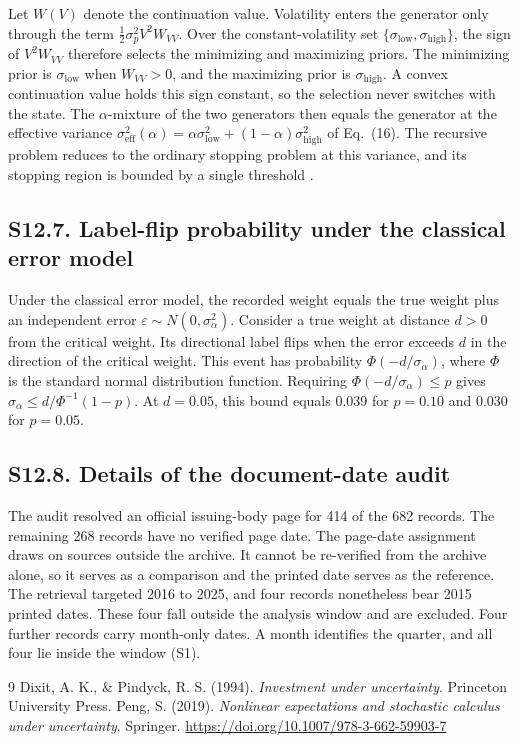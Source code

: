 \documentclass[11pt]{article}
\newcommand{\slow}{\sigma_{\mathrm{low}}}
\newcommand{\shigh}{\sigma_{\mathrm{high}}}
\begin{document}
Let $W(V)$ denote the continuation value. Volatility enters the generator only through the term $\tfrac{1}{2}\sigma_p^{2}V^{2}W_{VV}$. Over the constant-volatility set $\{\slow,\shigh\}$, the sign of $V^{2}W_{VV}$ therefore selects the minimizing and maximizing priors. The minimizing prior is $\slow$ when $W_{VV}>0$, and the maximizing prior is $\shigh$. A convex continuation value holds this sign constant, so the selection never switches with the state. The $\alpha$-mixture of the two generators then equals the generator at the effective variance $\sigma_{\mathrm{eff}}^{2}(\alpha)=\alpha\slow^{2}+(1-\alpha)\shigh^{2}$ of Eq.~(16). The recursive problem reduces to the ordinary stopping problem at this variance, and its stopping region is bounded by a single threshold \citep{Peng2019}.

\subsection*{S12.7. Label-flip probability under the classical error model}

Under the classical error model, the recorded weight equals the true weight plus an independent error $\varepsilon\sim N(0,\sigma_{\alpha}^{2})$. Consider a true weight at distance $d>0$ from the critical weight. Its directional label flips when the error exceeds $d$ in the direction of the critical weight. This event has probability $\Phi(-d/\sigma_{\alpha})$, where $\Phi$ is the standard normal distribution function. Requiring $\Phi(-d/\sigma_{\alpha})\le p$ gives $\sigma_{\alpha}\le d/\Phi^{-1}(1-p)$. At $d=0.05$, this bound equals 0.039 for $p=0.10$ and 0.030 for $p=0.05$.

\subsection*{S12.8. Details of the document-date audit}

The audit resolved an official issuing-body page for 414 of the 682 records. The remaining 268 records have no verified page date. The page-date assignment draws on sources outside the archive. It cannot be re-verified from the archive alone, so it serves as a comparison and the printed date serves as the reference. The retrieval targeted 2016 to 2025, and four records nonetheless bear 2015 printed dates. These four fall outside the analysis window and are excluded. Four further records carry month-only dates. A month identifies the quarter, and all four lie inside the window (S1).

\begin{thebibliography}{9}
Dixit, A. K., \& Pindyck, R. S. (1994). \emph{Investment under uncertainty}. Princeton University Press.
Peng, S. (2019). \emph{Nonlinear expectations and stochastic calculus under uncertainty}. Springer. \url{https://doi.org/10.1007/978-3-662-59903-7}
\end{thebibliography}
\end{document}
